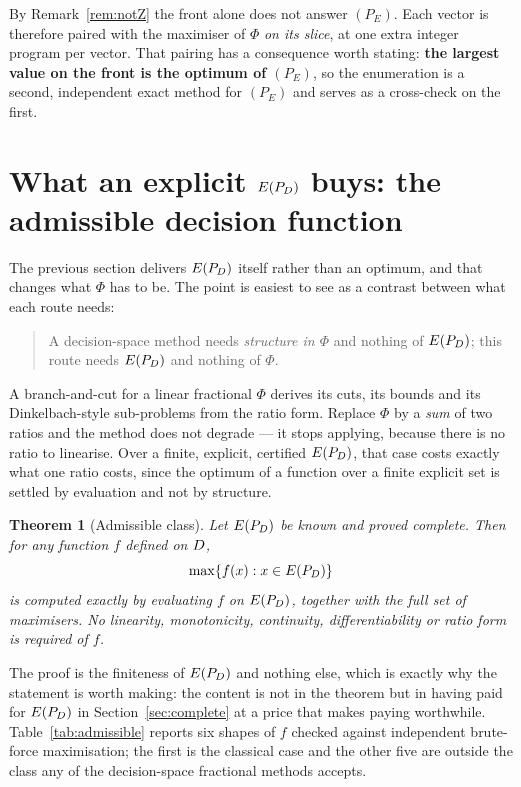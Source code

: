 \documentclass[11pt,a4paper]{article}
\newtheorem{theorem}{Theorem}
\begin{document}
By Remark~\ref{rem:notZ} the front alone does not answer $(P_E)$.  Each vector
is therefore paired with the maximiser of $\Phi$ \emph{on its slice}, at one
extra integer program per vector.  That pairing has a consequence worth
stating: \textbf{the largest value on the front is the optimum of $(P_E)$}, so
the enumeration is a second, independent exact method for $(P_E)$ and serves as
a cross-check on the first.

\section{What an explicit \texorpdfstring{$E(P_{D})$}{E(P\_D)} buys: the admissible
decision function}
\label{sec:admissible}

The previous section delivers $E(P_{D})$ itself rather than an optimum, and that
changes what $\Phi$ has to be.  The point is easiest to see as a contrast
between what each route needs:

\begin{quote}
A decision-space method needs \emph{structure in $\Phi$} and nothing of $E(P_{D})$;
this route needs \emph{$E(P_{D})$} and nothing of $\Phi$.
\end{quote}

\noindent
A branch-and-cut for a linear fractional $\Phi$ derives its cuts, its bounds
and its Dinkelbach-style sub-problems from the ratio form.  Replace $\Phi$ by a
\emph{sum} of two ratios and the method does not degrade --- it stops applying,
because there is no ratio to linearise.  Over a finite, explicit, certified
$E(P_{D})$, that case costs exactly what one ratio costs, since the optimum of a
function over a finite explicit set is settled by evaluation and not by
structure.

\begin{theorem}[Admissible class]\label{thm:admissible}
Let $E(P_{D})$ be known and proved complete.  Then for \emph{any} function $f$
defined on $D$,
\[
  \max\{ f(x) : x \in E(P_{D}) \}
\]
is computed exactly by evaluating $f$ on $E(P_{D})$, together with the full set of
maximisers.  No linearity, monotonicity, continuity, differentiability or ratio
form is required of $f$.
\end{theorem}

\noindent
The proof is the finiteness of $E(P_{D})$ and nothing else, which is exactly why the
statement is worth making: the content is not in the theorem but in having paid
for $E(P_{D})$ in Section~\ref{sec:complete} at a price that makes paying worthwhile.
Table~\ref{tab:admissible} reports six shapes of $f$ checked against
independent brute-force maximisation; the first is the classical case and the
other five are outside the class any of the decision-space fractional methods
accepts.
\end{document}
